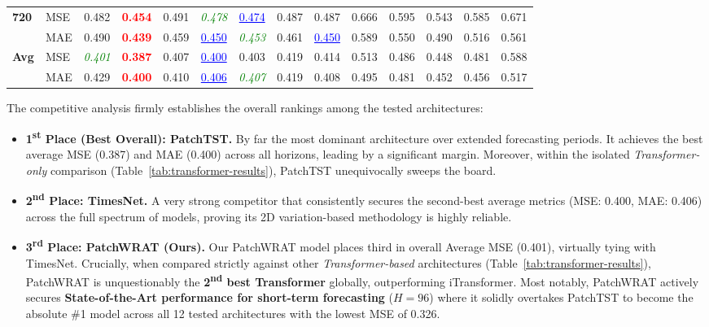 \documentclass[11pt, letterpaper]{article}
\begin{document}
\begin{table}[H]
{\begin{tabular}{@{}llcccccccccccc@{}}
\multirow{2}{*}{\textbf{720}} 
 & MSE & 0.482 & \textcolor{red}{\textbf{0.454}} & 0.491 & \textcolor{green}{\textit{0.478}} & \textcolor{blue}{\underline{0.474}} & 0.487 & 0.487 & 0.666 & 0.595 & 0.543 & 0.585 & 0.671 \\
 & MAE & 0.490 & \textcolor{red}{\textbf{0.439}} & 0.459 & \textcolor{blue}{\underline{0.450}} & \textcolor{green}{\textit{0.453}} & 0.461 & \textcolor{blue}{\underline{0.450}} & 0.589 & 0.550 & 0.490 & 0.516 & 0.561 \\
\midrule
\multirow{2}{*}{\textbf{Avg}} 
 & MSE & \textcolor{green}{\textit{0.401}} & \textcolor{red}{\textbf{0.387}} & 0.407 & \textcolor{blue}{\underline{0.400}} & 0.403 & 0.419 & 0.414 & 0.513 & 0.486 & 0.448 & 0.481 & 0.588 \\
 & MAE & 0.429 & \textcolor{red}{\textbf{0.400}} & 0.410 & \textcolor{blue}{\underline{0.406}} & \textcolor{green}{\textit{0.407}} & 0.419 & 0.408 & 0.495 & 0.481 & 0.452 & 0.456 & 0.517 \\
\bottomrule
\end{tabular}
}
\end{table}

The competitive analysis firmly establishes the overall rankings among the tested architectures:
\begin{itemize}
    \item \textbf{1\textsuperscript{st} Place (Best Overall): PatchTST.} By far the most dominant architecture over extended forecasting periods. It achieves the best average MSE (0.387) and MAE (0.400) across all horizons, leading by a significant margin. Moreover, within the isolated \textit{Transformer-only} comparison (Table~\ref{tab:transformer-results}), PatchTST unequivocally sweeps the board.
    \item \textbf{2\textsuperscript{nd} Place: TimesNet.} A very strong competitor that consistently secures the second-best average metrics (MSE: 0.400, MAE: 0.406) across the full spectrum of models, proving its 2D variation-based methodology is highly reliable.
    \item \textbf{3\textsuperscript{rd} Place: PatchWRAT (Ours).} Our PatchWRAT model places third in overall Average MSE (0.401), virtually tying with TimesNet. Crucially, when compared strictly against other \textit{Transformer-based} architectures (Table~\ref{tab:transformer-results}), PatchWRAT is unquestionably the \textbf{2\textsuperscript{nd} best Transformer} globally, outperforming iTransformer. Most notably, PatchWRAT actively secures \textbf{State-of-the-Art performance for short-term forecasting} ($H=96$) where it solidly overtakes PatchTST to become the absolute \#1 model across all 12 tested architectures with the lowest MSE of 0.326.
\end{itemize}
\end{document}
